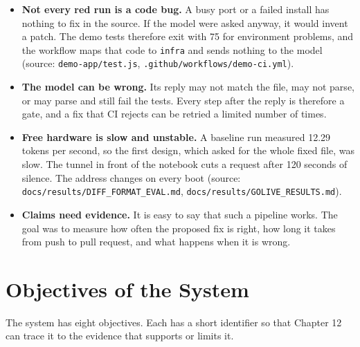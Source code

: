 \begin{itemize}
  \item \textbf{Not every red run is a code bug.} A busy port or a failed install has nothing to fix in the source. If the model were asked anyway, it would invent a patch. The demo tests therefore exit with 75 for environment problems, and the workflow maps that code to \texttt{infra} and sends nothing to the model (source: \texttt{demo-app/\allowbreak{}test.js}, \texttt{.github/\allowbreak{}workflows/\allowbreak{}demo-ci.yml}).
  \item \textbf{The model can be wrong.} Its reply may not match the file, may not parse, or may parse and still fail the tests. Every step after the reply is therefore a gate, and a fix that CI rejects can be retried a limited number of times.
  \item \textbf{Free hardware is slow and unstable.} A baseline run measured 12.29 tokens per second, so the first design, which asked for the whole fixed file, was slow. The tunnel in front of the notebook cuts a request after 120 seconds of silence. The address changes on every boot (source: \texttt{docs/\allowbreak{}results/\allowbreak{}DIFF\_\allowbreak{}FORMAT\_\allowbreak{}EVAL.md}, \texttt{docs/\allowbreak{}results/\allowbreak{}GOLIVE\_\allowbreak{}RESULTS.md}).
  \item \textbf{Claims need evidence.} It is easy to say that such a pipeline works. The goal was to measure how often the proposed fix is right, how long it takes from push to pull request, and what happens when it is wrong.
\end{itemize}

\section{Objectives of the System}

The system has eight objectives. Each has a short identifier so that Chapter 12 can trace it to the evidence that supports or limits it.

